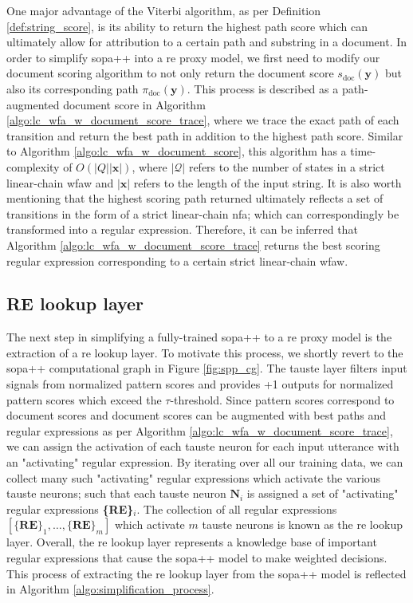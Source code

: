 One major advantage of the Viterbi algorithm, as per Definition
\ref{def:string_score}, is its ability to return the highest path score which
can ultimately allow for attribution to a certain path and substring in a
document. In order to simplify \ac{sopa}++ into a \ac{re} proxy model, we first need to
modify our document scoring algorithm to not only return the document score
$s_{\text{doc}}(\bm{y})$ but also its corresponding path
$\pi_{\text{doc}}(\bm{y})$. This process is described as a path-augmented
document score in Algorithm \ref{algo:lc_wfa_w_document_score_trace}, where we
trace the exact path of each transition and return the best path in addition to
the highest path score. Similar to Algorithm \ref{algo:lc_wfa_w_document_score},
this algorithm has a time-complexity of $O(|Q||\bm{x}|)$, where
$|\mathcal{Q}|$ refers to the number of states in a strict linear-chain
\ac{wfaw} and $|\bm{x}|$ refers to the length of the input string. It is also
worth mentioning that the highest scoring path returned ultimately reflects a set of
transitions in the form of a strict linear-chain \ac{nfa}; which can correspondingly
be transformed into a regular expression. Therefore, it can be inferred that
Algorithm \ref{algo:lc_wfa_w_document_score_trace} returns the best scoring
regular expression corresponding to a certain strict linear-chain \ac{wfaw}.

\subsection{RE lookup layer}

The next step in simplifying a fully-trained \ac{sopa}++ to a \ac{re} proxy model is the
extraction of a \ac{re} lookup layer. To motivate this process, we shortly revert to
the \ac{sopa}++ computational graph in Figure \ref{fig:spp_cg}. The \ac{tauste} layer
filters input signals from normalized pattern scores and provides +1 outputs for
normalized pattern scores which exceed the $\tau$-threshold. Since pattern
scores correspond to document scores and document scores can be augmented with
best paths and regular expressions as per Algorithm
\ref{algo:lc_wfa_w_document_score_trace}, we can assign the activation of each
\ac{tauste} neuron for each input utterance with an "activating" regular expression.
By iterating over all our training data, we can collect many such "activating"
regular expressions which activate the various \ac{tauste} neurons; such that each
\ac{tauste} neuron $\textbf{N}_i$ is assigned a set of "activating" regular expressions
\textbf{\{RE\}$_i$}. The collection of all regular expressions
$[\{\textbf{RE}\}_1, \ldots, \{\textbf{RE}\}_m]$ which activate $m$ \ac{tauste}
neurons is known as the \ac{re} lookup layer. Overall, the \ac{re} lookup layer represents
a knowledge base of important regular expressions that cause the \ac{sopa}++ model to
make weighted decisions. This process of extracting the \ac{re} lookup layer from
the \ac{sopa}++ model is reflected in Algorithm \ref{algo:simplification_process}.

